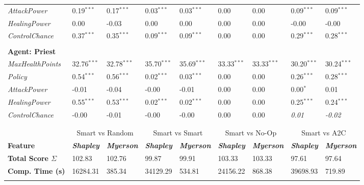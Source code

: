 \begin{tabular}{lllllllll}
\textit{AttackPower}     & 0.19${}^{***}$                    & 0.17${}^{***}$      & 0.03${}^{***}$ &   0.03${}^{***}$ & 0.00 & 0.00 & 0.09${}^{***}$  & 0.09${}^{***}$         \\
\textit{HealingPower}    & 0.00                   & -0.03     & 0.00  & 0.00 & 0.00 & 0.00 & -0.00  & -0.00        \\
\textit{ControlChance}   & 0.37${}^{***}$                   & 0.35${}^{***}$    & 0.09${}^{***}$    & 0.09${}^{***}$ & 0.00   & 0.00 & 0.29${}^{***}$  & 0.28${}^{***}$        \\
&                           & & & & &                          & &\\
\textbf{Agent: Priest }        &                           &                           & &\\
\textit{MaxHealthPoints} & 32.76${}^{***}$                   & 32.78${}^{***}$ & 35.70${}^{***}$ &  35.69${}^{***}$ & 33.33${}^{***}$  & 33.33${}^{***}$ & 30.20${}^{***}$  & 30.24${}^{***}$                \\
\textit{Policy}     & 0.54${}^{***}$                    & 0.56${}^{***}$      & 0.02${}^{***}$ &   0.03${}^{***}$ & 0.00 & 0.00 & 0.26${}^{***}$  & 0.28${}^{***}$         \\
\textit{AttackPower}     & -0.01                    & -0.04      & -0.00 &   -0.01 & 0.00 & 0.00 & 0.00${}^{*}$  & 0.01         \\
\textit{HealingPower}    & 0.55${}^{***}$                   & 0.53${}^{***}$     & 0.02${}^{***}$  & 0.02${}^{***}$ & 0.00 & 0.00 & 0.25${}^{***}$  & 0.24${}^{***}$        \\
\textit{ControlChance}   & -0.00                   & -0.01    & -0.00    & -0.00 & 0.00   & 0.00 & \textit{0.01}  & \textit{-0.02}        \\
&                           & & & & &                          & &\\
&                           & & & & &                          & &\\
&\multicolumn{2}{c}{Smart vs Random}&\multicolumn{2}{c}{Smart vs Smart}&\multicolumn{2}{c}{Smart vs No-Op}&\multicolumn{2}{c}{Smart vs A2C}\\
\textbf{Feature}         & \textit{\textbf{Shapley}} & \textit{\textbf{Myerson}}& \textit{\textbf{Shapley}} & \textit{\textbf{Myerson}}& \textit{\textbf{Shapley}} & \textit{\textbf{Myerson}}& \textit{\textbf{Shapley}} & \textit{\textbf{Myerson}} \\
\textbf{Total Score $\Sigma$} & 102.83&102.76&99.87&99.91&103.33&103.33&97.61&97.64 \\\n\textbf{Comp. Time (s)} & 16284.31&385.34&34129.29&534.81&24156.22&868.38&39698.93&719.89 \\\n\hline

\end{tabular}

